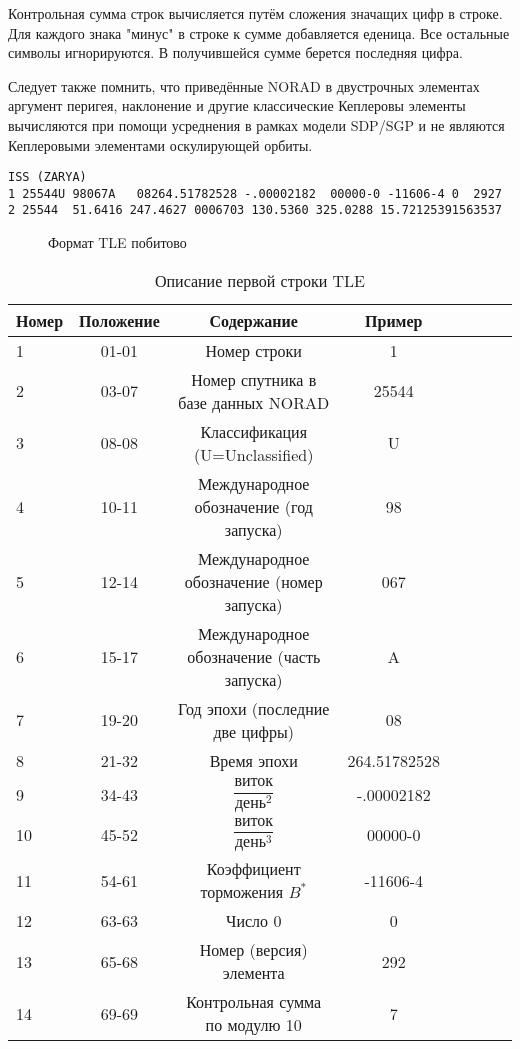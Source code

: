 Контрольная сумма строк вычисляется путём сложения значащих цифр в строке. Для каждого знака "минус" в строке к
сумме добавляется еденица. Все остальные символы игнорируются. В получившейся сумме берется последняя цифра.

Следует также помнить, что приведённые NORAD в двустрочных элементах аргумент перигея, наклонение и другие
классические Кеплеровы элементы вычисляются при помощи усреднения в рамках модели SDP/SGP и не являются Кеплеровыми
элементами оскулирующей орбиты.
\begin{lstlisting}[basicstyle=\fontsize{10}{11}\ttfamily,
	caption={TLE-Запись Для Модуля Заря Международной Космической Станции},label={lst:ISS_ZARYA}]
ISS (ZARYA)             
1 25544U 98067A   08264.51782528 -.00002182  00000-0 -11606-4 0  2927
2 25544  51.6416 247.4627 0006703 130.5360 325.0288 15.72125391563537
\end{lstlisting}
\begin{figure}[h] 
	\begin{center}
			
	\end{center}
	\caption{Формат TLE побитово} \label{fig:tle-format}
\end{figure}
\begin{table}[]
\centering
\caption{Описание первой строки TLE}
\label{tab:tle-str-1}
\begin{tabular}{l*{6}{c}r}
	Номер 	& Положение 	& Содержание								& Пример\\
	\hline
	1 		& 01-01 		& Номер строки 								& 1		\\
	2 		& 03-07			& Номер спутника в базе данных NORAD		& 25544	\\
	3		& 08-08			& Классификация (U=Unclassified)			& U		\\
	4		& 10-11			& Международное обозначение (год запуска)	& 98	\\
	5		& 12-14			& Международное обозначение (номер запуска)	& 067	\\
	6		& 15-17			& Международное обозначение (часть запуска)	& A		\\
	7		& 19-20			& Год эпохи (последние две цифры)			& 08	\\
	8		& 21-32			& Время эпохи 								& 264.51782528 \\
	9		& 34-43			& $\dfrac{\text{виток}}{\text{день}^2}$		& -.00002182 \\
	10		& 45-52			& $\dfrac{\text{виток}}{\text{день}^3}$ 	& 00000-0 \\
	11		& 54-61			& Коэффициент торможения $B^{*}$		& -11606-4 \\
	12		& 63-63			& Число 0 									& 0 \\
	13		& 65-68			& Номер (версия) элемента					& 292 \\
	14		& 69-69			& Контрольная сумма по модулю 10			& 7
\end{tabular}
\end{table}

